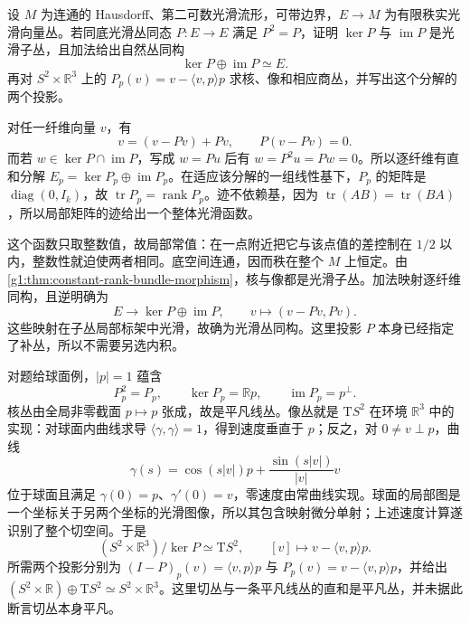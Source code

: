 \begin{exercise}\label{g1:ex:smooth-idempotent-subbundles}
	设 \(M\) 为连通的 Hausdorff、第二可数光滑流形，可带边界，\(E\to M\) 为有限秩实光滑向量丛。若同底光滑丛同态 \(P:E\to E\) 满足 \(P^2=P\)，证明 \(\ker P\) 与 \(\operatorname{im}P\) 是光滑子丛，且加法给出自然丛同构
	\[
		\ker P\oplus\operatorname{im}P\simeq E.
	\]
	再对 \(S^2\times\mathbb R^3\) 上的 \(P_p(v)=v-\langle v,p\rangle p\) 求核、像和相应商丛，并写出这个分解的两个投影。
\end{exercise}
\begin{solution}
	对任一纤维向量 \(v\)，有
	\[
		v=(v-Pv)+Pv,\qquad P(v-Pv)=0.
	\]
	而若 \(w\in\ker P\cap\operatorname{im}P\)，写成 \(w=Pu\) 后有 \(w=P^2u=Pw=0\)。所以逐纤维有直和分解 \(E_p=\ker P_p\oplus\operatorname{im}P_p\)。在适应该分解的一组线性基下，\(P_p\) 的矩阵是 \(\operatorname{diag}(0,I_k)\)，故 \(\operatorname{tr}P_p=\operatorname{rank}P_p\)。迹不依赖基，因为 \(\operatorname{tr}(AB)=\operatorname{tr}(BA)\)，所以局部矩阵的迹给出一个整体光滑函数。

	这个函数只取整数值，故局部常值：在一点附近把它与该点值的差控制在 \(1/2\) 以内，整数性就迫使两者相同。底空间连通，因而秩在整个 \(M\) 上恒定。由\cref{g1:thm:constant-rank-bundle-morphism}，核与像都是光滑子丛。加法映射逐纤维同构，且逆明确为
	\[
		E\longrightarrow\ker P\oplus\operatorname{im}P,\qquad
		v\longmapsto(v-Pv,Pv).
	\]
	这些映射在子丛局部标架中光滑，故确为光滑丛同构。这里投影 \(P\) 本身已经指定了补丛，所以不需要另选内积。

	对题给球面例，\(|p|=1\) 蕴含
	\[
		P_p^2=P_p,\qquad
		\ker P_p=\mathbb Rp,\qquad
		\operatorname{im}P_p=p^\perp.
	\]
	核丛由全局非零截面 \(p\mapsto p\) 张成，故是平凡线丛。像丛就是 \(\mathrm{T}S^2\) 在环境 \(\mathbb R^3\) 中的实现：对球面内曲线求导 \(\langle\gamma,\gamma\rangle=1\)，得到速度垂直于 \(p\)；反之，对 \(0\ne v\perp p\)，曲线
	\[
		\gamma(s)=\cos(s|v|)p+\frac{\sin(s|v|)}{|v|}v
	\]
	位于球面且满足 \(\gamma(0)=p\)、\(\gamma'(0)=v\)，零速度由常曲线实现。球面的局部图是一个坐标关于另两个坐标的光滑图像，所以其包含映射微分单射；上述速度计算遂识别了整个切空间。于是
	\[
		(S^2\times\mathbb R^3)/\ker P\simeq \mathrm{T}S^2,
		\qquad [v]\longmapsto v-\langle v,p\rangle p.
	\]
	所需两个投影分别为 \((I-P)_p(v)=\langle v,p\rangle p\) 与 \(P_p(v)=v-\langle v,p\rangle p\)，并给出 \((S^2\times\mathbb R)\oplus \mathrm{T}S^2\simeq S^2\times\mathbb R^3\)。这里切丛与一条平凡线丛的直和是平凡丛，并未据此断言切丛本身平凡。
\end{solution}

